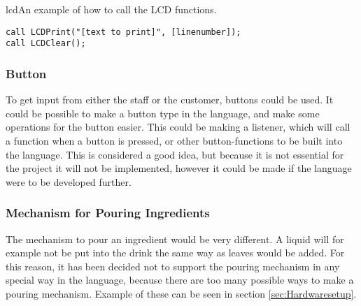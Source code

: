 \begin{code}{lcd}{An example of how to call the LCD functions.}
\begin{lstlisting}[mathescape]
call LCDPrint("[text to print]", [linenumber]);
call LCDClear();
\end{lstlisting}
\end{code}

\subsubsection{Button}
To get input from either the staff or the customer, buttons could be used. It could be possible to make a button type in the language, and make some operations for the button easier. This could be making a listener, which will call a function when a button is pressed, or other button-functions to be built into the language. This is considered a good idea, but because it is not essential for the project it will not be implemented, however it could be made if the language were to be developed further.

\subsubsection{Mechanism for Pouring Ingredients}
The mechanism to pour an ingredient would be very different. A liquid will for example not be put into the drink the same way as leaves would be added. For this reason, it has been decided not to support the pouring mechanism in any special way in the language, because there are too many possible ways to make a pouring mechanism. Example of these can be seen in section \ref{sec:Hardwaresetup}.